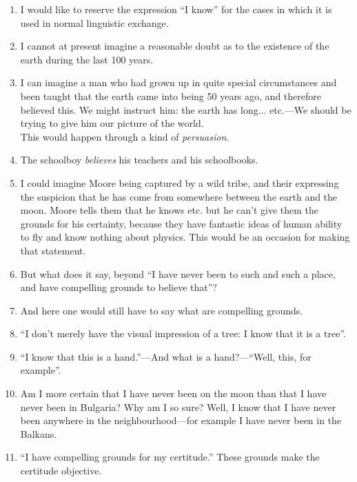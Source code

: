 \documentclass{book}
\begin{document}
\begin{enumerate}
\item
I would like to reserve the expression ``I know'' for the cases in which it is
used in normal linguistic exchange.

\item
I cannot at present imagine a reasonable doubt as to the existence of the earth
during the last 100 years.

\item
I can imagine a man who had grown up in quite special circumstances and been
taught that the earth came into being 50 years ago, and therefore believed
this. We might instruct him: the earth has long... etc.---We should be trying
to give him our picture of the world. \\
This would happen through a kind of \emph{persuasion}.

\item
The schoolboy \emph{believes} his teachers and his schoolbooks.

\item
I could imagine Moore being captured by a wild tribe, and their expressing the
suspicion that he has come from somewhere between the earth and the moon. Moore
tells them that he knows etc. but he can't give them the grounds for his
certainty, because they have fantastic ideas of human ability to fly and know
nothing about physics. This would be an occasion for making that statement.

\item
But what does it say, beyond ``I have never been to such and such a place, and
have compelling grounds to believe that''?

\item
And here one would still have to say what are compelling grounds.

\item
``I don't merely have the visual impression of a tree: I know that it is a
tree''.

\item
``I know that this is a hand.''---And what is a hand?---``Well, this, for
example''.

\item
Am I more certain that I have never been on the moon than that I have never
been in Bulgaria? Why am I so sure? Well, I know that I have never been
anywhere in the neighbourhood---for example I have never been in the Balkans.

\item
``I have compelling grounds for my certitude.'' These grounds make the
certitude objective.


\end{enumerate}
\end{document}
